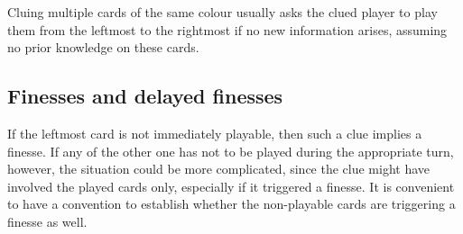 \documentclass[a4paper]{article}
\theoremstyle{plain}
\theoremstyle{definition}
\newtheorem{convention}[theorem]{Convention}
\begin{document}
Cluing multiple cards of the same colour usually asks the clued player to play them from the leftmost to the rightmost if no new information arises, assuming no prior knowledge on these cards.

\subsection{Finesses and delayed finesses}

If the leftmost card is not immediately playable, then such a clue implies a finesse. If any of the other one has not to be played during the appropriate turn, however, the situation could be more complicated, since the clue might have involved the played cards only, especially if it triggered a finesse. It is convenient to have a convention to establish whether the non-playable cards are triggering a finesse as well.

\end{document}
